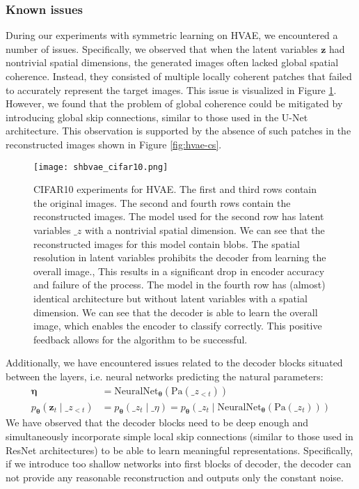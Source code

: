 \subsubsection*{Known issues}
During our experiments with symmetric learning on HVAE, we encountered a number of issues. Specifically, we observed that when the latent variables $\mathbf{z}$ had nontrivial
spatial dimensions, the generated images often lacked global spatial coherence. Instead, they consisted of multiple locally coherent patches that failed to accurately represent 
the target images. This issue is visualized in Figure \ref{fig:cifar10-exp}. However, we found that the problem of global coherence could be mitigated by introducing global skip
connections, similar to those used in the U-Net architecture. This observation is supported by the absence of such patches in the reconstructed images shown in Figure \ref{fig:hvae-cs}.
\begin{figure}[b]
    \centering
    \texttt{[image: shbvae\_cifar10.png]}
    \caption[Issues with spatial coherence]{CIFAR10 experiments for HVAE. The first and third rows contain the original images. The second and fourth rows contain the reconstructed images.
    The model used for the second row has latent variables $\_z$ with a nontrivial spatial dimension. We can see that the reconstructed images for this model contain blobs. The spatial resolution 
    in latent variables prohibits the decoder from learning the overall image., This results in a significant drop in encoder accuracy and failure of the process.
    The model in the fourth row has (almost) identical architecture but without latent variables with a spatial dimension. We can see that the decoder is able to learn the overall image, which 
    enables the encoder to classify correctly. This positive feedback allows for the algorithm to be successful.}
    \label{fig:cifar10-exp}
\end{figure}


Additionally, we have encountered issues related to the decoder blocks situated between the layers, i.e. neural networks predicting the natural parameters:
\begin{align*}
    \boldsymbol{\eta} &= \mathrm{NeuralNet}_{\boldsymbol{\theta}}(\text{Pa}(\_z_{<t})) \\
    p_{\boldsymbol{\theta}}(\mathbf{z}_t \mid \_z_{<t}) &= p_{\boldsymbol{\theta}}(\_z_t \mid \_\eta) =  p_{\boldsymbol{\theta}}(\_z_t \mid \mathrm{NeuralNet}_{\boldsymbol{\theta}}(\text{Pa}(\_z_t)))
\end{align*}
We have observed that the decoder blocks need to be deep enough and simultaneously incorporate simple local skip connections 
(similar to those used in ResNet architectures) to be able to learn meaningful representations. Specifically, if we introduce too shallow networks into first blocks
of decoder, the decoder can not provide any reasonable reconstruction and outputs only the constant noise. 


